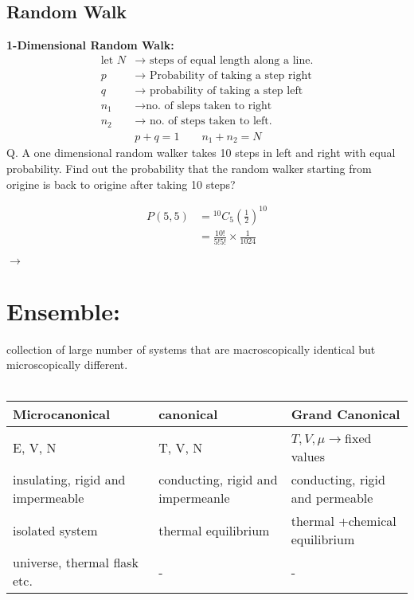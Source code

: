 \subsection{Random Walk}
\textbf{1-Dimensional Random Walk:}\\
\begin{align*}
\text{let }N &\rightarrow\text{ steps of equal length along a line.}\\
p &\rightarrow\text{ Probability of taking a step right}\\
q &\rightarrow\text{ probability of taking a step left}\\
n_{1} &\rightarrow \text{no. of sleps taken to right }\\
n_{2} &\rightarrow\text{ no. of steps taken to left.}\\
&p+q=1\qquad n_{1}+n_{2}=N
\end{align*}
Q. A one dimensional random walker takes 10 steps in left and right with equal probability.  Find out the probability that the random walker starting from origine is back to origine after taking 10 steps?
\begin{answer}
	\begin{align*}
	P(5,5) &={ }^{10} C_{5}\left(\frac{1}{2}\right)^{10} \\
	&=\frac{10 !}{5 ! 5 !} \times \frac{1}{1024}
	\end{align*}
\end{answer}
$\rightarrow$ \section{Ensemble:} collection of large number of systems that are macroscopically identical but microscopically different.\\\\
\begin{tabular}{|p{4cm}|p{4cm}|p{4cm}|}
	Microcanonical&canonical&Grand Canonical\\\hline
	E, V, N&T, V, N&$T, V, \mu \rightarrow$fixed values \\\hline
	insulating, rigid and impermeable&conducting, rigid and impermeanle&conducting, rigid and permeable \\\hline
	isolated system &thermal equilibrium &  thermal +chemical equilibrium \\\hline
	universe, thermal flask etc.&-&-\\\hline
\end{tabular}\\
